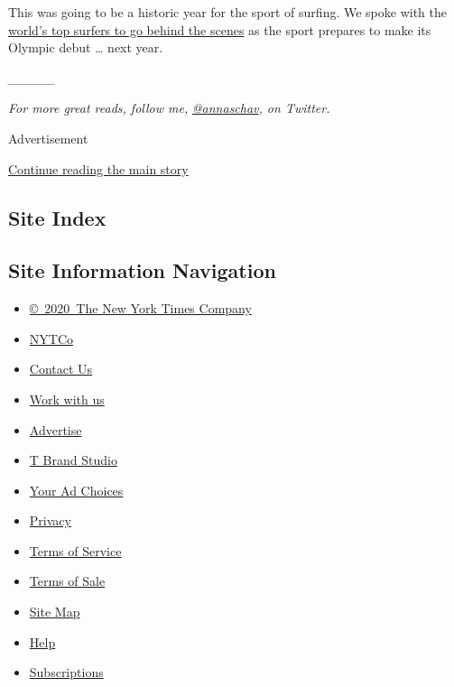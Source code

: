This was going to be a historic year for the sport of surfing. We spoke
with the
\href{https://www.nytimes3xbfgragh.onion/video/sports/olympics/100000007219144/summer-olympics.html}{world's
top surfers to go behind the scenes} as the sport prepares to make its
Olympic debut \ldots{} next year.

\emph{\_\_\_\_\_}

\emph{For more great reads, follow me,}
\href{https://twitter.com/annaschav}{\emph{@annaschav}}\emph{, on
Twitter.}

Advertisement

\protect\hyperlink{after-bottom}{Continue reading the main story}

\hypertarget{site-index}{%
\subsection{Site Index}\label{site-index}}

\hypertarget{site-information-navigation}{%
\subsection{Site Information
Navigation}\label{site-information-navigation}}

\begin{itemize}
\tightlist
\item
  \href{https://help.nytimes3xbfgragh.onion/hc/en-us/articles/115014792127-Copyright-notice}{©~2020~The
  New York Times Company}
\end{itemize}

\begin{itemize}
\tightlist
\item
  \href{https://www.nytco.com/}{NYTCo}
\item
  \href{https://help.nytimes3xbfgragh.onion/hc/en-us/articles/115015385887-Contact-Us}{Contact
  Us}
\item
  \href{https://www.nytco.com/careers/}{Work with us}
\item
  \href{https://nytmediakit.com/}{Advertise}
\item
  \href{http://www.tbrandstudio.com/}{T Brand Studio}
\item
  \href{https://www.nytimes3xbfgragh.onion/privacy/cookie-policy\#how-do-i-manage-trackers}{Your
  Ad Choices}
\item
  \href{https://www.nytimes3xbfgragh.onion/privacy}{Privacy}
\item
  \href{https://help.nytimes3xbfgragh.onion/hc/en-us/articles/115014893428-Terms-of-service}{Terms
  of Service}
\item
  \href{https://help.nytimes3xbfgragh.onion/hc/en-us/articles/115014893968-Terms-of-sale}{Terms
  of Sale}
\item
  \href{https://spiderbites.nytimes3xbfgragh.onion}{Site Map}
\item
  \href{https://help.nytimes3xbfgragh.onion/hc/en-us}{Help}
\item
  \href{https://www.nytimes3xbfgragh.onion/subscription?campaignId=37WXW}{Subscriptions}
\end{itemize}
